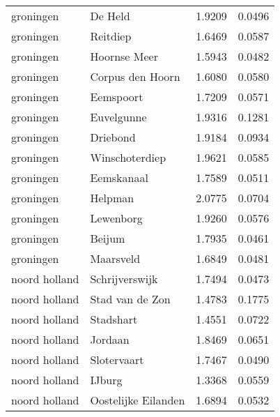 \begin{longtable}{llcc}
	groningen     & De Held                 & 1.9209  & 0.0496                               \\
	groningen     & Reitdiep                & 1.6469  & 0.0587                               \\
	groningen     & Hoornse Meer            & 1.5943  & 0.0482                               \\
	groningen     & Corpus den Hoorn        & 1.6080  & 0.0580                               \\
	groningen     & Eemspoort               & 1.7209  & 0.0571                               \\
	groningen     & Euvelgunne              & 1.9316  & 0.1281                               \\
	groningen     & Driebond                & 1.9184  & 0.0934                               \\
	groningen     & Winschoterdiep          & 1.9621  & 0.0585                               \\
	groningen     & Eemskanaal              & 1.7589  & 0.0511                               \\
	groningen     & Helpman                 & 2.0775  & 0.0704                               \\
	groningen     & Lewenborg               & 1.9260  & 0.0576                               \\
	groningen     & Beijum                  & 1.7935  & 0.0461                               \\
	groningen     & Maarsveld               & 1.6849  & 0.0481                               \\
	noord holland & Schrijverswijk          & 1.7494  & 0.0473                               \\
	noord holland & Stad van de Zon         & 1.4783  & 0.1775                               \\
	noord holland & Stadshart               & 1.4551  & 0.0722                               \\
	noord holland & Jordaan                 & 1.8469  & 0.0651                               \\
	noord holland & Slotervaart             & 1.7467  & 0.0490                               \\
	noord holland & IJburg                  & 1.3368  & 0.0559                               \\
	noord holland & Oostelijke Eilanden     & 1.6894  & 0.0532                               \\

\end{longtable}
